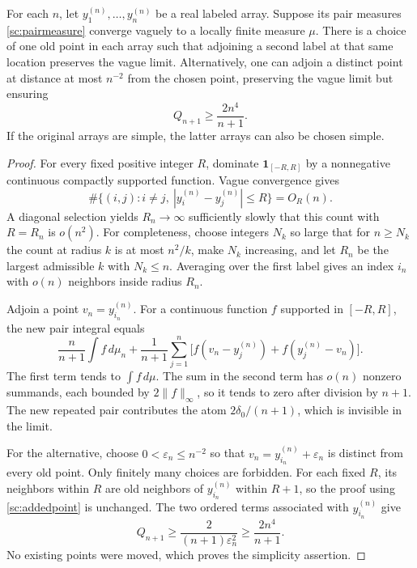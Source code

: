 \begin{lemma}
\label{sc:sparselemma}
For each $n$, let $y_1^{(n)},\ldots,y_n^{(n)}$ be a real labeled array.
Suppose its pair measures \eqref{sc:pairmeasure} converge vaguely to a
locally finite measure $\mu$. There is a choice of one old point in each
array such that adjoining a second label at that same location preserves
the vague limit. Alternatively, one can adjoin a distinct point at
distance at most $n^{-2}$ from the chosen point, preserving the vague
limit but ensuring
\begin{equation}
 Q_{n+1}\ge\frac{2n^4}{n+1}.
 \label{sc:nearpairgrowth}
\end{equation}
If the original arrays are simple, the latter arrays can also be chosen
simple.
\end{lemma}

\begin{proof}
For every fixed positive integer $R$, dominate
$\mathbf 1_{[-R,R]}$ by a nonnegative continuous compactly supported
function. Vague convergence gives
\[
 \#\{(i,j):i\ne j,\ |y_i^{(n)}-y_j^{(n)}|\le R\}=O_R(n).
\]
A diagonal selection yields $R_n\to\infty$ sufficiently slowly that
this count with $R=R_n$ is $o(n^2)$. For completeness, choose integers
$N_k$ so large that for $n\ge N_k$ the count at radius $k$ is at most
$n^2/k$, make $N_k$ increasing, and let $R_n$ be the largest admissible
$k$ with $N_k\le n$. Averaging over the first label gives an index $i_n$
with $o(n)$ neighbors inside radius $R_n$.

Adjoin a point $v_n=y_{i_n}^{(n)}$. For a continuous function $f$
supported in $[-R,R]$, the new pair integral equals
\begin{equation}
 \frac{n}{n+1}\int f\,d\mu_n+
 \frac1{n+1}\sum_{j=1}^{n}
 \bigl[f(v_n-y_j^{(n)})+f(y_j^{(n)}-v_n)\bigr].
 \label{sc:addedpoint}
\end{equation}
The first term tends to $\int f\,d\mu$. The sum in the second term has
$o(n)$ nonzero summands, each bounded by $2\lVert f\rVert_\infty$,
so it tends to zero after division by $n+1$. The new repeated pair
contributes the atom $2\delta_0/(n+1)$, which is invisible in the limit.

For the alternative, choose $0<\varepsilon_n\le n^{-2}$ so that
$v_n=y_{i_n}^{(n)}+\varepsilon_n$ is distinct from every old point.
Only finitely many choices are forbidden. For each fixed $R$, its
neighbors within $R$ are old neighbors of $y_{i_n}^{(n)}$ within $R+1$,
so the proof using \eqref{sc:addedpoint} is unchanged. The two ordered
terms associated with $y_{i_n}^{(n)}$ give
\[
 Q_{n+1}\ge\frac{2}{(n+1)\varepsilon_n^2}
 \ge\frac{2n^4}{n+1}.
\]
No existing points were moved, which proves the simplicity assertion.
\end{proof}

